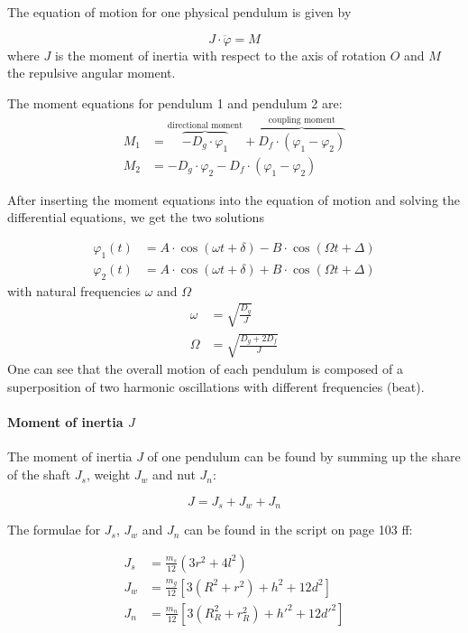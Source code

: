 \documentclass{scrreprt}
\renewcommand{\phi}{\varphi}
\begin{document}
The equation of motion for one physical pendulum is given by

\begin{equation}
J\cdot \ddot{\phi} = M
\end{equation}
where $J$ is the moment of inertia with respect to the axis of rotation $O$ and $M$ the repulsive angular moment.

The moment equations for pendulum 1 and pendulum 2 are:
\begin{align}
M_1 &= \overbrace{-D_g\cdot \phi_1}^{\text{directional moment}} + \overbrace{D_f \cdot (\phi_1 - \phi_2)}^{\text{coupling moment}}  \\
M_2 &= -D_g\cdot \phi_2 - D_f \cdot (\phi_1 - \phi_2)
\end{align}

After inserting the moment equations into the equation of motion and solving the differential equations, we get the two solutions

\begin{align}
\phi_1(t) &= A \cdot \cos{(\omega t + \delta)} - B \cdot \cos{(\Omega t + \Delta)}\\
\phi_2(t) &= A \cdot \cos{(\omega t + \delta)} + B \cdot \cos{(\Omega t + \Delta)}
\end{align}
with natural frequencies $\omega$ and $\Omega$
\begin{align}
\omega &= \sqrt{\frac{D_g}{J}}\\
\Omega &= \sqrt{\frac{D_g+2 D_f}{J}}
\end{align}
One can see that the overall motion of each pendulum is composed of a superposition of two harmonic oscillations with different frequencies (beat).

\paragraph{Moment of inertia $J$}
The moment of inertia $J$ of one pendulum can be found by summing up the share of the shaft $J_s$, weight $J_w$ and nut $J_n$:

\begin{equation}
J = J_s + J_w + J_n
\end{equation}

The formulae for $J_s$, $J_w$ and $J_n$ can be found in the script on page 103 ff:

\begin{align}
J_s &= \frac{m_s}{12} \left( 3 r^2 + 4 l^2 \right)\\
J_w &= \frac{m_g}{12} \left[ 3(R^2 + r^2) + h^2 +12d^2 \right]\\
J_n &= \frac{m_n}{12} \left[ 3 ( R_R^2+r_R^2) + h'^2+12d'^2 \right]
\end{align}
\end{document}
